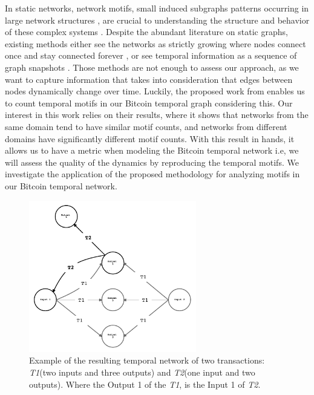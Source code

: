 \documentclass[../../thesis.tex]{subfiles}
\begin{document}
 In static networks, network motifs, small induced subgraphs patterns occurring in large network structures \cite{benson2016higher_4,milo2002network_19,wu2010evidence_29}, are crucial to understanding the structure and behavior of these complex systems \cite{temporalMotifs}. Despite the abundant literature on static graphs, existing methods either see the networks as strictly growing where nodes connect once and stay connected forever \cite{barabasi1999emergence_2,jacobs2015assembling_10,leskovec2007graph_17}, or see temporal information as a sequence of graph snapshots \cite{araujo2014com2_1,dunlavy2011temporal_6,tantipathananandh2007framework_23}. Those methods are not enough to assess our approach, as we want to capture information that takes into consideration that edges between nodes dynamically change over time. Luckily, the proposed work from \citeauthor{temporalMotifs}\cite{temporalMotifs} enables us to count temporal motifs in our Bitcoin temporal graph considering this.  Our interest in this work relies on their results, where it shows that networks from the same domain tend to have similar motif counts, and networks from different domains have significantly different motif counts. With this result in hands, it allows us to have a metric when modeling the Bitcoin temporal network i.e, we will assess the quality of the dynamics by reproducing the temporal motifs. We investigate the application of the proposed methodology \cite{temporalMotifs} for analyzing motifs in our Bitcoin temporal network.


\begin{figure}
\centering
\includegraphics[width=0.65\textwidth]{content/unveiling/img/temporal_network}
\caption{Example of the resulting temporal network of two transactions: \textit{T1}(two inputs and three outputs) and \textit{T2}(one input and two outputs). Where the Output 1 of the \textit{T1}, is the Input 1 of \textit{T2}.}
\label{fig:temporalNetwork}
\end{figure}
\end{document}
